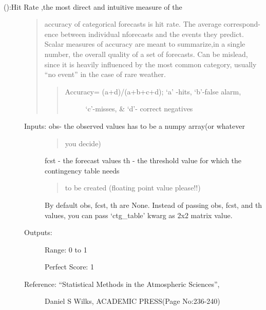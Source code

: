 \documentclass[letterpaper,10pt,english]{sphinxmanual}
\begin{document}
\begin{fulllineitems}
\label{diagnosis:ctgfunction.accuracy}~\begin{description}
\item[{{\hyperref[diagnosis:ctgfunction.accuracy]{}} ():Hit Rate ,the most direct and intuitive measure of the}] \leavevmode\begin{quote}

accuracy of categorical forecasts is hit rate. The average correspond-
ence between individual nforecasts and the events they predict. Scalar
measures  of accuracy are meant to summarize,in a single number, the
overall quality of a set of forecasts. Can be mislead, since it is
heavily influenced by the most common category, usually ``no event''
in the case of rare weather.
\begin{quote}
\begin{description}
\item[{Accuracy= (a+d)/(a+b+c+d); `a' -hits, `b'-false alarm,}] \leavevmode
`c'-misses, \& `d'- correct negatives

\end{description}
\end{quote}
\end{quote}
\begin{description}
\item[{Inputs: obs- the observed values has to be a numpy array(or whatever}] \leavevmode\begin{quote}

you decide)
\end{quote}

fcst - the forecast values
th  - the threshold value for which the contingency table needs
\begin{quote}

to be created (floating point value please!!)
\end{quote}

By default obs, fcst, th are None. Instead of passing obs, fcst,
and th values, you can pass `ctg\_table' kwarg as 2x2 matrix value.

\item[{Outputs:}] \leavevmode
Range: 0 to 1

Perfect Score: 1

\item[{Reference: ``Statistical Methods in the Atmospheric Sciences'',}] \leavevmode
Daniel S Wilks, ACADEMIC PRESS(Page No:236-240)


\end{description}
\end{description}
\end{fulllineitems}
\end{document}
